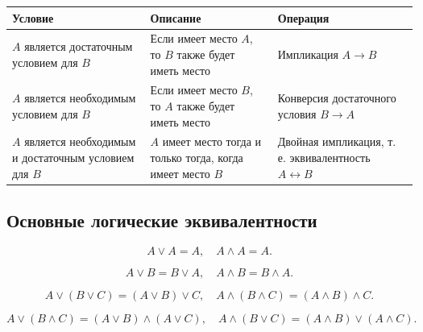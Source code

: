 {
    \renewcommand*{\arraystretch}{1.5}
    \begin{longtable}{|C{0.27\textwidth}|C{0.27\textwidth}|C{0.27\textwidth}|}
        \hline
        \textbf{Условие}                                            & \textbf{Описание}                                               & \textbf{Операция}                                                 \\
        \hline
        \(A\) является достаточным условием для \(B\)               & Если имеет место \(A\), то \(B\) также будет иметь место        & Импликация \(A \to B\)                                            \\
        \hline
        \(A\) является необходимым условием для \(B\)               & Если имеет место \(B\), то \(A\) также будет иметь место        & Конверсия достаточного условия \(B \to A\)                        \\
        \hline
        \(A\) является необходимым и достаточным условием для \(B\) & \(A\) имеет место тогда и только тогда, когда имеет место \(B\) & Двойная импликация, т. е. эквивалентность \(A \leftrightarrow B\) \\
        \hline
    \end{longtable}
}

\subsection{Основные логические эквивалентности}

\begin{property}[Идемпотентность]
    \[
        A \lor A = A,
        \quad
        A \land A = A.
    \]
\end{property}

\begin{property}[Коммутативность]
    \[
        A \lor B = B \lor A,
        \quad
        A \land B = B \land A.
    \]
\end{property}

\begin{property}[Ассоциативность]
    \[
        A \lor (B \lor C) = (A \lor B) \lor C,
        \quad
        A \land (B \land C) = (A \land B) \land C.
    \]
\end{property}

\begin{property}[Дистрибутивность]
    \[
        A \lor (B \land C) = (A \lor B) \land (A \lor C),
        \quad
        A \land (B \lor C) = (A \land B) \lor (A \land C).
    \]
\end{property}

